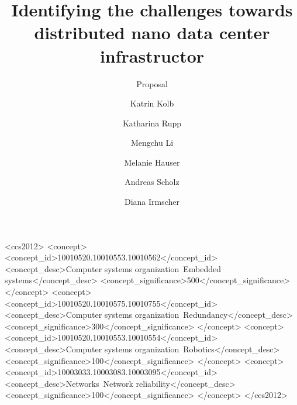 \documentclass[sigchi, review]{acmart}
\begin{document}
\title{Identifying the challenges towards distributed nano data center infrastructor}
\subtitle{Proposal}

\author{Katrin Kolb}

\author{Katharina Rupp}

\author{Mengchu Li}

\author{Melanie Hauser}

\author{Andreas Scholz}
  
\author{Diana Irmscher} 

\renewcommand{\shortauthors}{B. Trovato et al.}


\begin{abstract} %

\end{abstract}

%
%
\begin{CCSXML}
<ccs2012>
 <concept>
  <concept_id>10010520.10010553.10010562</concept_id>
  <concept_desc>Computer systems organization~Embedded systems</concept_desc>
  <concept_significance>500</concept_significance>
 </concept>
 <concept>
  <concept_id>10010520.10010575.10010755</concept_id>
  <concept_desc>Computer systems organization~Redundancy</concept_desc>
  <concept_significance>300</concept_significance>
 </concept>
 <concept>
  <concept_id>10010520.10010553.10010554</concept_id>
  <concept_desc>Computer systems organization~Robotics</concept_desc>
  <concept_significance>100</concept_significance>
 </concept>
 <concept>
  <concept_id>10003033.10003083.10003095</concept_id>
  <concept_desc>Networks~Network reliability</concept_desc>
  <concept_significance>100</concept_significance>
 </concept>
</ccs2012>  
\end{CCSXML}
\end{document}
